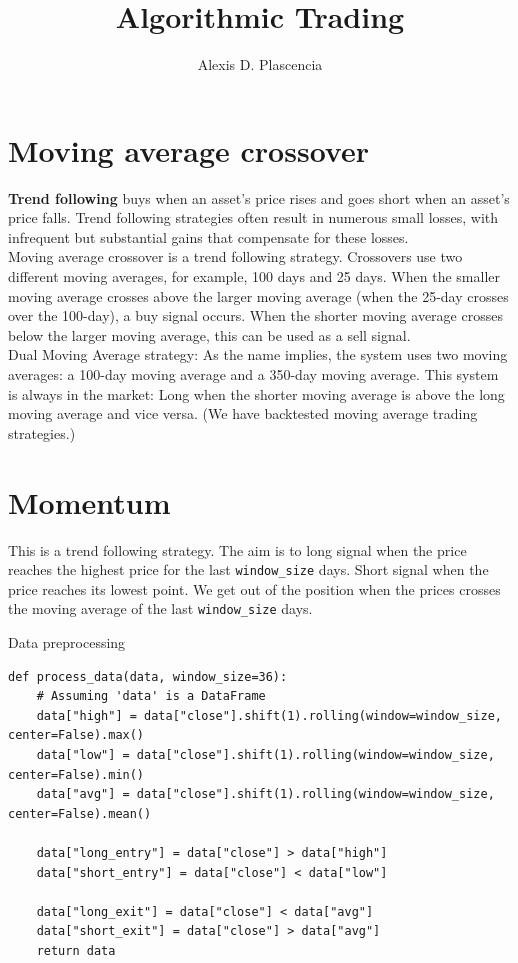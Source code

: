 \documentclass[a4paper,11pt]{article}  %
\title{\boldmath Algorithmic Trading}
\author{Alexis D. Plascencia}
\begin{document}
 
\maketitle
\flushbottom
\clearpage

\section{Moving average crossover}

\textbf{Trend following} buys when an asset’s price rises and goes short when an asset’s price falls. Trend following strategies often result in numerous small losses, with infrequent but substantial gains that compensate for these losses. \\

Moving average crossover is a trend following strategy. Crossovers use two different moving averages, for example, 100 days and 25 days. When the smaller moving average crosses above the larger moving average (when the 25-day crosses over the 100-day), a buy signal occurs. When the shorter moving average crosses below the larger moving average, this can be used as a sell signal.\\

Dual Moving Average strategy: As the name implies, the system uses two moving averages: a 100-day moving average and a 350-day moving average. This system is always in the market: Long when the shorter moving average is above the long moving average and vice versa. (We have backtested moving average trading strategies.) \\

\section{Momentum}

This is a trend following strategy. The aim is to long signal when the price reaches the highest price for the last \texttt{window\_size} days. Short signal when the price reaches its lowest point. We get out of the position when the prices crosses the moving average of the last \texttt{window\_size} days. \\

\begin{redbox}{Data preprocessing}
\begin{lstlisting}
def process_data(data, window_size=36):
    # Assuming 'data' is a DataFrame
    data["high"] = data["close"].shift(1).rolling(window=window_size, center=False).max()
    data["low"] = data["close"].shift(1).rolling(window=window_size, center=False).min()
    data["avg"] = data["close"].shift(1).rolling(window=window_size, center=False).mean()

    data["long_entry"] = data["close"] > data["high"]
    data["short_entry"] = data["close"] < data["low"]

    data["long_exit"] = data["close"] < data["avg"]
    data["short_exit"] = data["close"] > data["avg"]
    return data

\end{lstlisting}
\end{redbox}
\end{document}
